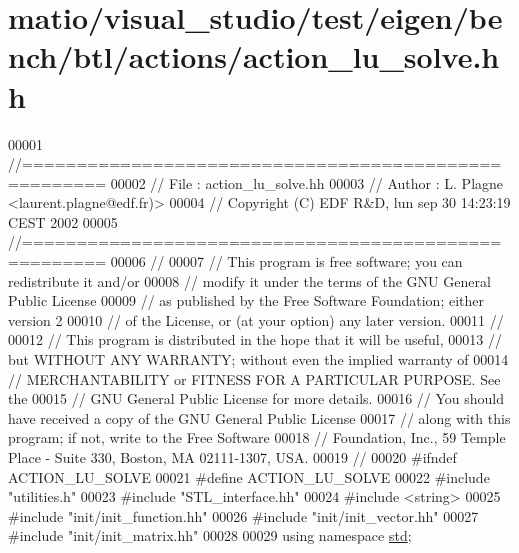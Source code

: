 \hypertarget{matio_2visual__studio_2test_2eigen_2bench_2btl_2actions_2action__lu__solve_8hh_source}{}\section{matio/visual\+\_\+studio/test/eigen/bench/btl/actions/action\+\_\+lu\+\_\+solve.hh}
\label{matio_2visual__studio_2test_2eigen_2bench_2btl_2actions_2action__lu__solve_8hh_source}

\begin{DoxyCode}
00001 \textcolor{comment}{//=====================================================}
00002 \textcolor{comment}{// File   :  action\_lu\_solve.hh}
00003 \textcolor{comment}{// Author :  L. Plagne <laurent.plagne@edf.fr)>        }
00004 \textcolor{comment}{// Copyright (C) EDF R&D,  lun sep 30 14:23:19 CEST 2002}
00005 \textcolor{comment}{//=====================================================}
00006 \textcolor{comment}{// }
00007 \textcolor{comment}{// This program is free software; you can redistribute it and/or}
00008 \textcolor{comment}{// modify it under the terms of the GNU General Public License}
00009 \textcolor{comment}{// as published by the Free Software Foundation; either version 2}
00010 \textcolor{comment}{// of the License, or (at your option) any later version.}
00011 \textcolor{comment}{// }
00012 \textcolor{comment}{// This program is distributed in the hope that it will be useful,}
00013 \textcolor{comment}{// but WITHOUT ANY WARRANTY; without even the implied warranty of}
00014 \textcolor{comment}{// MERCHANTABILITY or FITNESS FOR A PARTICULAR PURPOSE.  See the}
00015 \textcolor{comment}{// GNU General Public License for more details.}
00016 \textcolor{comment}{// You should have received a copy of the GNU General Public License}
00017 \textcolor{comment}{// along with this program; if not, write to the Free Software}
00018 \textcolor{comment}{// Foundation, Inc., 59 Temple Place - Suite 330, Boston, MA  02111-1307, USA.}
00019 \textcolor{comment}{// }
00020 \textcolor{preprocessor}{#ifndef ACTION\_LU\_SOLVE}
00021 \textcolor{preprocessor}{#define ACTION\_LU\_SOLVE}
00022 \textcolor{preprocessor}{#include "utilities.h"}
00023 \textcolor{preprocessor}{#include "STL\_interface.hh"}
00024 \textcolor{preprocessor}{#include <string>}
00025 \textcolor{preprocessor}{#include "init/init\_function.hh"}
00026 \textcolor{preprocessor}{#include "init/init\_vector.hh"}
00027 \textcolor{preprocessor}{#include "init/init\_matrix.hh"}
00028 
00029 \textcolor{keyword}{using namespace }\hyperlink{namespacestd}{std};

\end{DoxyCode}
